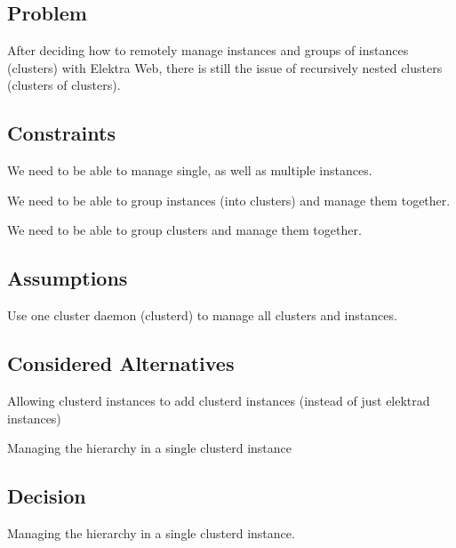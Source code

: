 \subsection*{Problem}

After deciding how to remotely manage instances and groups of instances (clusters) with Elektra Web, there is still the issue of recursively nested clusters (clusters of clusters).

\subsection*{Constraints}


\begin{DoxyItemize}
\item We need to be able to manage single, as well as multiple instances.
\item We need to be able to group instances (into clusters) and manage them together.
\item We need to be able to group clusters and manage them together.
\end{DoxyItemize}

\subsection*{Assumptions}


\begin{DoxyItemize}
\item Use one cluster daemon (clusterd) to manage all clusters and instances.
\end{DoxyItemize}

\subsection*{Considered Alternatives}


\begin{DoxyItemize}
\item Allowing clusterd instances to add clusterd instances (instead of just elektrad instances)
\item Managing the hierarchy in a single clusterd instance
\end{DoxyItemize}

\subsection*{Decision}

Managing the hierarchy in a single clusterd instance.


